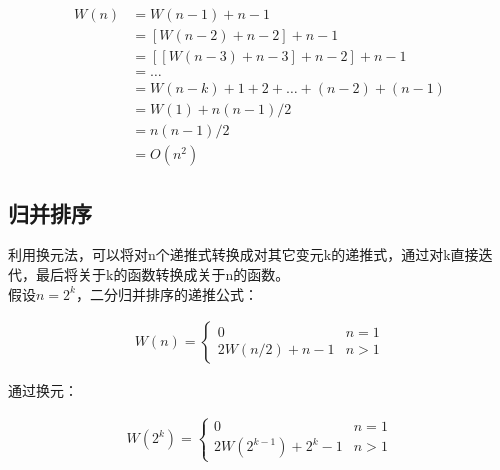 \begin{align*}
	W(n) & = W(n - 1) + n - 1                             \\
	     & = [W(n - 2) + n - 2] + n - 1                   \\
	     & = [[W(n - 3) + n - 3] + n - 2] + n - 1         \\
	     & = \dots                                        \\
	     & = W(n - k) + 1 + 2 + \dots + (n - 2) + (n - 1) \\
	     & = W(1) + n(n - 1) / 2                          \\
	     & = n(n - 1) / 2                                 \\
	     & = O(n^2)
\end{align*}

\vspace{0.5cm}

\subsection{归并排序}

利用换元法，可以将对n个递推式转换成对其它变元k的递推式，通过对k直接迭代，最后将关于k的函数转换成关于n的函数。\\

假设$ n = 2^k $，二分归并排序的递推公式：

\vspace{-0.5cm}

\begin{align*}
	W(n) = \begin{cases}
		0               & n = 1 \\
		2W(n/2) + n - 1 & n > 1
	\end{cases}
\end{align*}

通过换元：

\vspace{-0.5cm}

\begin{align*}
	W(2^k) = \begin{cases}
		0                     & n = 1 \\
		2W(2^{k-1}) + 2^k - 1 & n > 1
	\end{cases}
\end{align*}

\vspace{-0.5cm}

